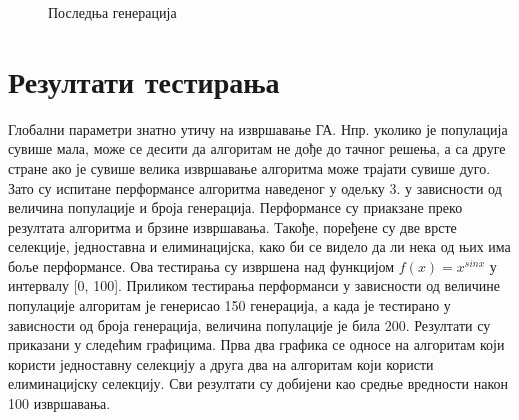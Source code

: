 \documentclass{article}
\begin{document}
\begin{figure}[H]
    \centering

    \caption{Последња генерација}
\end{figure}

\section{Резултати тестирања}
Глобални параметри знатно утичу на извршавање ГА. Нпр. уколико је популација сувише мала,
може се десити да алгоритам не дође до тачног решења, а са друге стране ако је сувише велика
извршавање алгоритма може трајати сувише дуго. Зато су испитане перформансе алгоритма наведеног
у одељку 3. у зависности од величина популације и броја генерација. Перформансе су приакзане преко 
резултата алгоритма и брзине извршавања. Такође, поређене су две врсте селекције, једноставна и елиминацијска, како би
се видело да ли нека од њих има боље перформансе. Ова тестирања су извршена над функцијом $f(x) = x^{sin x}$ у интервалу [0, 100].
Приликом тестирања перформанси у зависности од величине популације алгоритам је генерисао 150 генерација,
а када је тестирано у зависности од броја генерација, величина популације је била 200.
Резултати су приказани у следећим графицима. Прва два графика се односе на алгоритам који користи једноставну селекцију
а друга два на алгоритам који користи елиминацијску селекцију. Сви резултати су добијени као средње вредности након 
100 извршавања.
\end{document}
